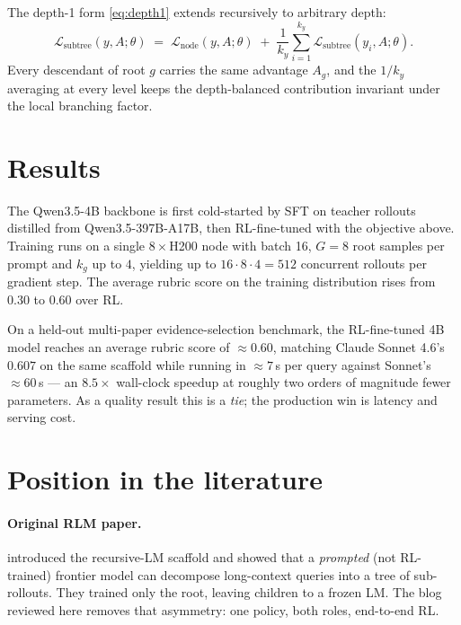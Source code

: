 \documentclass[11pt]{article}
\begin{document}
The depth-1 form \eqref{eq:depth1} extends recursively to arbitrary depth:
\begin{equation}
\mathcal{L}_{\text{subtree}}(y, A; \theta)
\;=\; \mathcal{L}_{\text{node}}(y, A; \theta)
   \;+\; \frac{1}{k_y} \sum_{i=1}^{k_y} \mathcal{L}_{\text{subtree}}(y_i, A; \theta).
\label{eq:subtree}
\end{equation}
Every descendant of root $g$ carries the same advantage $A_g$, and the
$1/k_y$ averaging at every level keeps the depth-balanced contribution
invariant under the local branching factor.

\section*{Results}

The Qwen3.5-4B backbone is first cold-started by SFT on teacher rollouts
distilled from Qwen3.5-397B-A17B, then RL-fine-tuned with the objective above.
Training runs on a single $8\times$H200 node with batch 16, $G=8$ root samples
per prompt and $k_g$ up to $4$, yielding up to $16 \cdot 8 \cdot 4 = 512$
concurrent rollouts per gradient step. The average rubric score on the training
distribution rises from $0.30$ to $0.60$ over RL.

On a held-out multi-paper evidence-selection benchmark, the RL-fine-tuned 4B
model reaches an average rubric score of $\approx 0.60$, matching Claude
Sonnet 4.6's $0.607$ on the same scaffold while running in $\approx 7$\,s per
query against Sonnet's $\approx 60$\,s --- an $8.5\times$ wall-clock speedup at
roughly two orders of magnitude fewer parameters. As a quality result this is a
\emph{tie}; the production win is latency and serving cost.

\section*{Position in the literature}

\paragraph{Original RLM paper.}
\citet{zhang2026rlm} introduced the recursive-LM scaffold and showed that a
\emph{prompted} (not RL-trained) frontier model can decompose long-context
queries into a tree of sub-rollouts. They trained only the root, leaving
children to a frozen LM. The blog reviewed here removes that asymmetry: one
policy, both roles, end-to-end RL.
\end{document}

